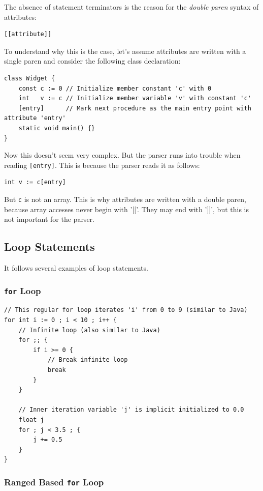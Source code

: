 \documentclass{report}
\begin{document}
The absence of statement terminators is the reason for the \textit{double paren} syntax of attributes:
\begin{lstlisting}
[[attribute]]
\end{lstlisting}
To understand why this is the case, let's assume attributes are written with a single paren and consider
the following class declaration:
\begin{lstlisting}
class Widget {
    const c := 0 // Initialize member constant 'c' with 0
    int   v := c // Initialize member variable 'v' with constant 'c'
    [entry]      // Mark next procedure as the main entry point with attribute 'entry'
    static void main() {}
}
\end{lstlisting}
Now this doesn't seem very complex. But the parser runs into trouble when reading \texttt{[entry]}.
This is because the parser reads it as follows:
\begin{lstlisting}
int v := c[entry]
\end{lstlisting}
But \texttt{c} is not an array. This is why attributes are written with a double paren, because array accesses
never begin with '[['. They may end with ']]', but this is not important for the parser.

\subsection{Loop Statements}

It follows several examples of loop statements.

\subsubsection{\texttt{for} Loop}

\begin{lstlisting}
// This regular for loop iterates 'i' from 0 to 9 (similar to Java)
for int i := 0 ; i < 10 ; i++ {
    // Infinite loop (also similar to Java)
    for ;; {
        if i >= 0 {
            // Break infinite loop
            break
        }
    }
    
    // Inner iteration variable 'j' is implicit initialized to 0.0
    float j
    for ; j < 3.5 ; {
        j += 0.5
    }
}
\end{lstlisting}

\subsubsection{Ranged Based \texttt{for} Loop}
\end{document}
